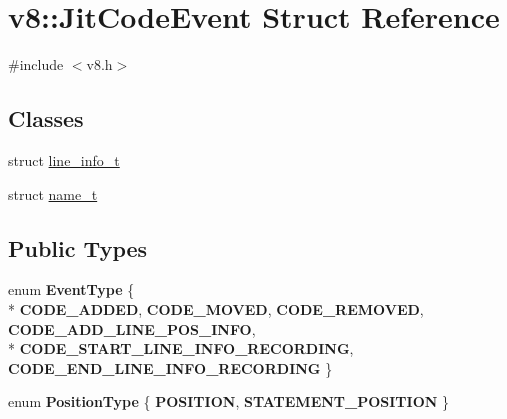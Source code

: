 \hypertarget{structv8_1_1_jit_code_event}{}\section{v8\+:\+:Jit\+Code\+Event Struct Reference}
\label{structv8_1_1_jit_code_event}


{\ttfamily \#include $<$v8.\+h$>$}

\subsection*{Classes}
\begin{DoxyCompactItemize}
\item 
struct \hyperlink{structv8_1_1_jit_code_event_1_1line__info__t}{line\+\_\+info\+\_\+t}
\item 
struct \hyperlink{structv8_1_1_jit_code_event_1_1name__t}{name\+\_\+t}
\end{DoxyCompactItemize}
\subsection*{Public Types}
\begin{DoxyCompactItemize}
\item 
\hypertarget{structv8_1_1_jit_code_event_ac4f8e391762567a2710eb5552b5f11f7}{}enum {\bfseries Event\+Type} \{ \\*
{\bfseries C\+O\+D\+E\+\_\+\+A\+D\+D\+E\+D}, 
{\bfseries C\+O\+D\+E\+\_\+\+M\+O\+V\+E\+D}, 
{\bfseries C\+O\+D\+E\+\_\+\+R\+E\+M\+O\+V\+E\+D}, 
{\bfseries C\+O\+D\+E\+\_\+\+A\+D\+D\+\_\+\+L\+I\+N\+E\+\_\+\+P\+O\+S\+\_\+\+I\+N\+F\+O}, 
\\*
{\bfseries C\+O\+D\+E\+\_\+\+S\+T\+A\+R\+T\+\_\+\+L\+I\+N\+E\+\_\+\+I\+N\+F\+O\+\_\+\+R\+E\+C\+O\+R\+D\+I\+N\+G}, 
{\bfseries C\+O\+D\+E\+\_\+\+E\+N\+D\+\_\+\+L\+I\+N\+E\+\_\+\+I\+N\+F\+O\+\_\+\+R\+E\+C\+O\+R\+D\+I\+N\+G}
 \}\label{structv8_1_1_jit_code_event_ac4f8e391762567a2710eb5552b5f11f7}

\item 
\hypertarget{structv8_1_1_jit_code_event_a02ca6a3e363d0d95142591fd454c8ba9}{}enum {\bfseries Position\+Type} \{ {\bfseries P\+O\+S\+I\+T\+I\+O\+N}, 
{\bfseries S\+T\+A\+T\+E\+M\+E\+N\+T\+\_\+\+P\+O\+S\+I\+T\+I\+O\+N}
 \}\label{structv8_1_1_jit_code_event_a02ca6a3e363d0d95142591fd454c8ba9}

\end{DoxyCompactItemize}
